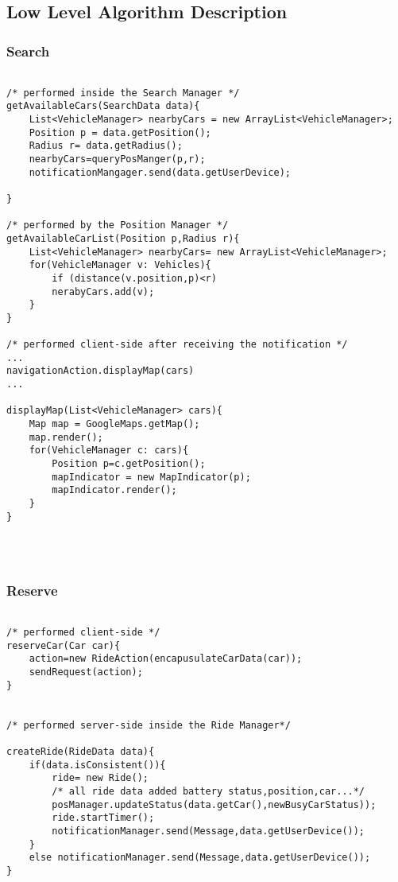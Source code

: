 \subsection{Low Level Algorithm Description}
\subsubsection{Search}

\begin{lstlisting}

/* performed inside the Search Manager */
getAvailableCars(SearchData data){
	List<VehicleManager> nearbyCars = new ArrayList<VehicleManager>;
	Position p = data.getPosition();
	Radius r= data.getRadius();
	nearbyCars=queryPosManger(p,r);
	notificationMangager.send(data.getUserDevice);

}

/* performed by the Position Manager */
getAvailableCarList(Position p,Radius r){
	List<VehicleManager> nearbyCars= new ArrayList<VehicleManager>;	
	for(VehicleManager v: Vehicles){
		if (distance(v.position,p)<r)
		nerabyCars.add(v);
	}
}

/* performed client-side after receiving the notification */
...
navigationAction.displayMap(cars)
...

displayMap(List<VehicleManager> cars){
	Map map = GoogleMaps.getMap();
	map.render();
	for(VehicleManager c: cars){
		Position p=c.getPosition();
		mapIndicator = new MapIndicator(p);
		mapIndicator.render();
	}
}


 

\end{lstlisting}

\subsubsection{Reserve}
\begin{lstlisting}

/* performed client-side */
reserveCar(Car car){
 	action=new RideAction(encapusulateCarData(car));
 	sendRequest(action);
}


/* performed server-side inside the Ride Manager*/

createRide(RideData data){
	if(data.isConsistent()){
		ride= new Ride();
		/* all ride data added battery status,position,car...*/
		posManager.updateStatus(data.getCar(),newBusyCarStatus));
		ride.startTimer();
		notificationManager.send(Message,data.getUserDevice());	
	}
	else notificationManager.send(Message,data.getUserDevice());
}



\end{lstlisting}
